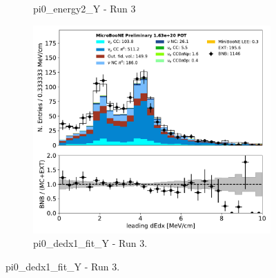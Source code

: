 \documentclass[a4paper]{article}
\begin{document}
\begin{figure}[H]
\begin{center}
\begin{subfigure}[b]{0.3\textwidth}
    \caption{\label{fig:pi0:inputs:energy12:RUN3} pi0\_energy2\_Y - Run 3}
    \end{subfigure}
    \begin{subfigure}[b]{0.3\textwidth}
    \centering
    \includegraphics[width=1.00\textwidth]{pi0/pi0_dedx1_fit_Y_01152020_inputs_RUN3.pdf}
    \caption{\label{fig:pi0:inputs:gammadot:RUN3} pi0\_dedx1\_fit\_Y - Run 3.}
    \end{subfigure}
\end{center}
\end{figure}
\end{document}
